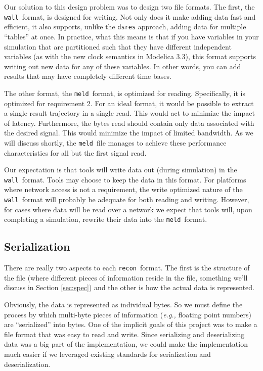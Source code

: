\documentclass[11pt,a4paper,twocolumn]{article}
\newcommand{\recon}{\texttt{recon}}
\newcommand{\wall}{\texttt{wall}}
\newcommand{\meld}{\texttt{meld}}
\newcommand{\code}[1]{\texttt{#1}} %
\begin{document}

Our solution to this design problem was to design two file formats.
The first, the \wall\ format, is designed for writing.  Not only does
it make adding data fast and efficient, it also supports, unlike the
\code{dsres} approach, adding data for multiple ``tables'' at once.
In practice, what this means is that if you have variables in your
simulation that are partitioned such that they have different
independent variables (as with the new clock semantics in Modelica
3.3), this format supports writing out new data for any of these
variables.  In other words, you can add results that may have
completely different time bases.

The other format, the \meld\ format, is optimized for reading.
Specifically, it is optimized for requirement 2.  For an ideal
format, it would be possible to extract a single result trajectory in
a single read.  This would act to minimize the impact of latency.
Furthermore, the bytes read should contain only data associated with
the desired signal.  This would minimize the impact of limited
bandwidth.  As we will discuss shortly, the \meld\ file manages to
achieve these performance characteristics for all but the first signal
read.

Our expectation is that tools will write data out (during simulation)
in the \wall\ format.  Tools may choose to keep the data in this
format.  For platforms where network access is not a requirement, the
write optimized nature of the \wall\ format will probably be adequate
for both reading and writing.  However, for cases where data will be
read over a network we expect that tools will, upon completing a
simulation, rewrite their data into the \meld\ format.

\subsection{Serialization}


There are really two aspects to each \recon\ format.  The first is the
structure of the file (where different pieces of information reside in
the file, something we'll discuss in Section \ref{sec:spec}) and the
other is how the actual data is represented.

Obviously, the data is represented as individual bytes.  So we must
define the process by which multi-byte pieces of information
(\textit{e.g.,} floating point numbers) are ``serialized'' into bytes.
One of the implicit goals of this project was to make a file format
that was easy to read and write.  Since serializing and deserializing
data was a big part of the implementation, we could make the
implementation much easier if we leveraged existing standards for
serialization and deserialization.
\end{document}
